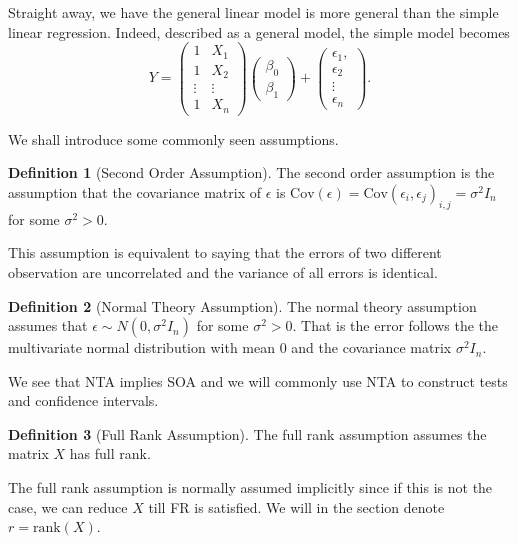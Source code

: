 \documentclass[
]{article}
\theoremstyle{definition}
\theoremstyle{definition}
\newtheorem{definition}{Definition}[section]
\begin{document}
Straight away, we have the general linear model is more general than the
simple linear regression. Indeed, described as a general model, the
simple model becomes \[Y = \begin{pmatrix}
  1 & X_1 \\ 1 & X_2 \\ \vdots & \vdots \\ 1 & X_n
\end{pmatrix}\begin{pmatrix}
  \beta_0 \\ \beta_1
\end{pmatrix} + 
\begin{pmatrix}
  \epsilon_1, \\ \epsilon_2 \\ \vdots \\ \epsilon_n
\end{pmatrix}.\]

We shall introduce some commonly seen assumptions.

\begin{definition}[Second Order Assumption]
  The second order assumption is the assumption that the covariance matrix 
  of \(\epsilon\) is \(\text{Cov}(\epsilon) = \text{Cov}(\epsilon_i, \epsilon_j)_{i, j} 
  = \sigma^2 I_n\) for some \(\sigma^2 > 0\).
\end{definition}

This assumption is equivalent to saying that the errors of two different
observation are uncorrelated and the variance of all errors is
identical.

\begin{definition}[Normal Theory Assumption]
  The normal theory assumption assumes that \(\epsilon \sim N(0, \sigma^2 I_n)\) 
  for some \(\sigma^2 > 0\). That is the error follows the the multivariate 
  normal distribution with mean \(0\) and the covariance matrix \(\sigma^2 I_n\).
\end{definition}

We see that NTA implies SOA and we will commonly use NTA to construct
tests and confidence intervals.

\begin{definition}[Full Rank Assumption]
  The full rank assumption assumes the matrix \(X\) has full rank.
\end{definition}

The full rank assumption is normally assumed implicitly since if this is
not the case, we can reduce \(X\) till FR is satisfied. We will in the
section denote \(r = \text{rank}(X)\).
\end{document}

